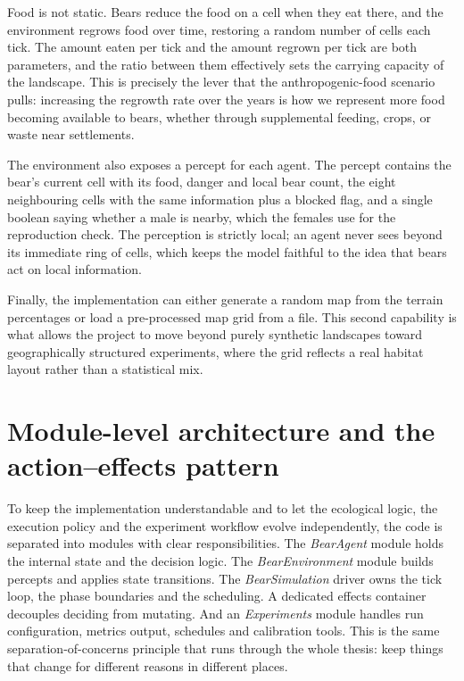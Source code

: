 Food is not static. Bears reduce the food on a cell when they eat there, and the environment regrows food over time, restoring a random number of cells each tick. The amount eaten per tick and the amount regrown per tick are both parameters, and the ratio between them effectively sets the carrying capacity of the landscape. This is precisely the lever that the anthropogenic-food scenario pulls: increasing the regrowth rate over the years is how we represent more food becoming available to bears, whether through supplemental feeding, crops, or waste near settlements.

The environment also exposes a percept for each agent. The percept contains the bear's current cell with its food, danger and local bear count, the eight neighbouring cells with the same information plus a blocked flag, and a single boolean saying whether a male is nearby, which the females use for the reproduction check. The perception is strictly local; an agent never sees beyond its immediate ring of cells, which keeps the model faithful to the idea that bears act on local information.

Finally, the implementation can either generate a random map from the terrain percentages or load a pre-processed map grid from a file. This second capability is what allows the project to move beyond purely synthetic landscapes toward geographically structured experiments, where the grid reflects a real habitat layout rather than a statistical mix.

\section{Module-level architecture and the action--effects pattern}

To keep the implementation understandable and to let the ecological logic, the execution policy and the experiment workflow evolve independently, the code is separated into modules with clear responsibilities. The \emph{BearAgent} module holds the internal state and the decision logic. The \emph{BearEnvironment} module builds percepts and applies state transitions. The \emph{BearSimulation} driver owns the tick loop, the phase boundaries and the scheduling. A dedicated effects container decouples deciding from mutating. And an \emph{Experiments} module handles run configuration, metrics output, schedules and calibration tools. This is the same separation-of-concerns principle that runs through the whole thesis: keep things that change for different reasons in different places.

